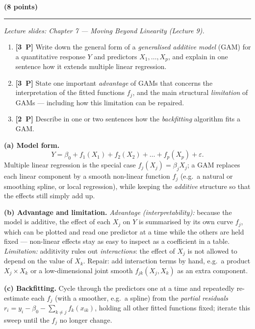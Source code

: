 \documentclass[11pt,a4paper]{article}
\newcommand{\problem}[2]{\par\vspace{7mm}\noindent{\large\textbf{Problem #1}}%
  \hfill{\large\textbf{(#2 points)}}\par\nopagebreak\vspace{0.6mm}%
  \noindent\rule{\textwidth}{0.6pt}\par\nopagebreak\vspace{2.5mm}}
\newcommand{\pp}[1]{\textbf{[#1~P]}\enspace}
\begin{document}
\problem{2: Generalised additive models}{8}
{\small\itshape Lecture slides: Chapter 7 --- Moving Beyond Linearity (Lecture 9).}\par\vspace{1mm}

\begin{enumerate}[label=(\alph*),leftmargin=7mm,itemsep=2.5mm]
  \item \pp{3} Write down the general form of a \emph{generalised additive model} (GAM) for a
    quantitative response $Y$ and predictors $X_1,\dots,X_p$, and explain in one sentence how it
    extends multiple linear regression.
  \item \pp{3} State one important \emph{advantage} of GAMs that concerns the interpretation of
    the fitted functions $f_j$, and the main structural \emph{limitation} of GAMs --- including
    how this limitation can be repaired.
  \item \pp{2} Describe in one or two sentences how the \emph{backfitting} algorithm fits a GAM.
\end{enumerate}

\ifdefined\withsolutions
\begin{solutionbox}
\textbf{(a) Model form.}
\[
  Y=\beta_0+f_1(X_1)+f_2(X_2)+\dots+f_p(X_p)+\varepsilon .
\]
Multiple linear regression is the special case $f_j(X_j)=\beta_jX_j$; a GAM replaces each linear
component by a smooth non-linear function $f_j$ (e.g.\ a natural or smoothing spline, or local
regression), while keeping the \emph{additive} structure so that the effects still simply add up.

\medskip
\textbf{(b) Advantage and limitation.}
\emph{Advantage (interpretability):} because the model is additive, the effect of each $X_j$ on
$Y$ is summarised by its own curve $f_j$, which can be plotted and read one predictor at a time
while the others are held fixed --- non-linear effects stay as easy to inspect as a coefficient
in a table.
\emph{Limitation:} additivity rules out \emph{interactions}: the effect of $X_j$ is not allowed
to depend on the value of $X_k$. Repair: add interaction terms by hand, e.g.\ a product
$X_j\times X_k$ or a low-dimensional joint smooth $f_{jk}(X_j,X_k)$ as an extra component.

\medskip
\textbf{(c) Backfitting.}
Cycle through the predictors one at a time and repeatedly re-estimate each $f_j$ (with a
smoother, e.g.\ a spline) from the \emph{partial residuals}
$r_i=y_i-\beta_0-\sum_{k\ne j}f_k(x_{ik})$, holding all other fitted functions fixed; iterate
this sweep until the $f_j$ no longer change.
\end{solutionbox}
\fi
\end{document}
